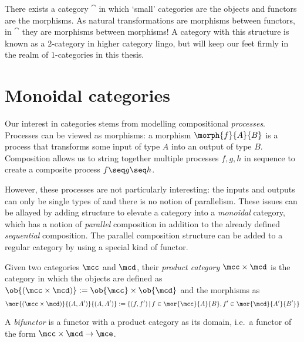 \begin{remark}
    There exists a category \(\cat\) in which `small' categories are the objects
    and functors are the morphisms.
    As natural transformations are morphisms between functors, in \(\cat\) they
    are morphisms between morphisms!
    A category with this structure is known as a \(2\)-category in higher
    category lingo, but will keep our feet firmly in the realm of
    \(1\)-categories in this thesis.
\end{remark}

\section{Monoidal categories}

Our interest in categories stems from modelling compositional \emph{processes}.
Processes can be viewed as morphisms: a morphism \(\morph{f}{A}{B}\) is a
process that transforms some input of type \(A\) into an output of type \(B\).
Composition allows us to string together multiple processes \(f, g, h\) in
sequence to create a composite process \(f \seq g \seq h\).

However, these processes are not particularly interesting: the inputs and
outputs can only be single types of and there is no notion of parallelism.
These issues can be allayed by adding structure to elevate a category into a
\emph{monoidal} category, which has a notion of \emph{parallel} composition in
addition to the already defined \emph{sequential} composition.
The parallel composition structure can be added to a regular category by using
a special kind of functor.

\begin{definition}
    Given two categories \(\mcc\) and \(\mcd\), their \emph{product category}
    \(\mcc \times \mcd\) is the category in which the objects are defined as \(
        \ob{(\mcc \times \mcd)} := \ob{\mcc} \times \ob{\mcd}
    \) and the morphisms as \[
        \mor{(\mcc \times \mcd)}{(A, A^\prime)}{(A, A^\prime)}
        :=
        \{
            (f, f^\prime)
            \,|\,
            f \in \mor{\mcc}{A}{B},
            f^\prime \in \mor{\mcd}{A^\prime}{B^\prime}
        \}
    \]
\end{definition}

\begin{definition}[Bifunctor]
    A \emph{bifunctor} is a functor with a product category as its domain, i.e.\
    a functor of the form \(\mcc \times \mcd \to \mce\).
\end{definition}

